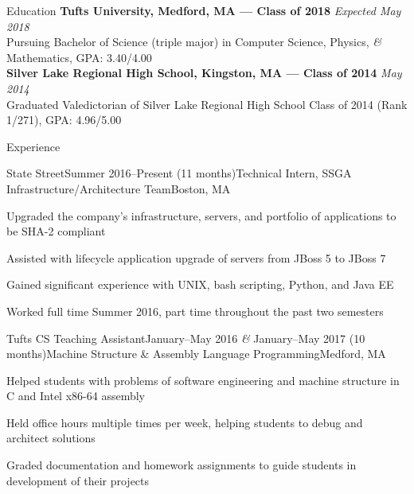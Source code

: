 \documentclass{resume}
\begin{document}
  \begin{rSection}{Education}
    {\bf Tufts University, Medford, MA --- Class of 2018} \hfill {\em Expected May 2018} \\ 
    { Pursuing Bachelor of Science (triple major) in Computer Science, Physics, \textit{\&} Mathematics, GPA: 3.40/4.00 }\\
    {\bf Silver Lake Regional High School, Kingston, MA --- Class of 2014} \hfill {\em May 2014}\\ 
    { Graduated Valedictorian of Silver Lake Regional High School Class of 2014 (Rank 1/271), GPA: 4.96/5.00 }
  \end{rSection}

  \begin{rSection}{Experience}
    \begin{rSubsection}{State Street}{Summer 2016--Present (11 months)}{Technical Intern, SSGA Infrastructure/Architecture Team}{Boston, MA}
    \item Upgraded the company’s infrastructure, servers, and portfolio of applications to be SHA-2 compliant
    \item Assisted with lifecycle application upgrade of servers from JBoss 5 to JBoss 7
    \item Gained significant experience with UNIX, bash scripting, Python, and Java EE
    \item Worked full time Summer 2016, part time throughout the past two semesters
    \end{rSubsection}

    \begin{rSubsection}{Tufts CS Teaching Assistant}{January--May 2016 \textit{\&} January--May 2017 (10 months)}{Machine Structure \& Assembly Language Programming}{Medford, MA}
    \item Helped students with problems of software engineering and machine structure in C and Intel x86-64 assembly
    \item Held office hours multiple times per week, helping students to debug and architect solutions
    \item Graded documentation and homework assignments to guide students in development of their projects
    \end{rSubsection}
  \end{rSection}
\end{document}
